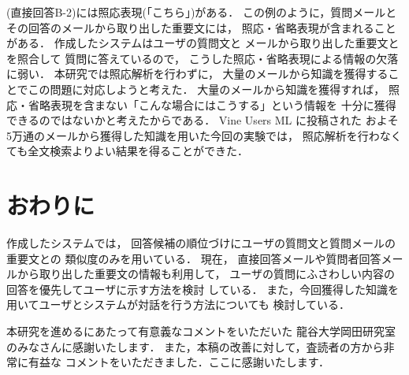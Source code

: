    (直接回答B-2)には照応表現(「こちら」)がある．
   この例のように，質問メールとその回答のメールから取り出した重要文には，
   照応・省略表現が含まれることがある．
   作成したシステムはユーザの質問文と
   メールから取り出した重要文とを照合して
   質問に答えているので，
   こうした照応・省略表現による情報の欠落に弱い．
   本研究では照応解析を行わずに，
   大量のメールから知識を獲得することでこの問題に対応しようと考えた．
   大量のメールから知識を獲得すれば，
   照応・省略表現を含まない「こんな場合にはこうする」という情報を
   十分に獲得できるのではないかと考えたからである．
   Vine Users ML に投稿された
   およそ5万通のメールから獲得した知識を用いた今回の実験では，
   照応解析を行わなくても全文検索よりよい結果を得ることができた．



 \section{おわりに}
 
作成したシステムでは，
回答候補の順位づけにユーザの質問文と質問メールの重要文との
類似度のみを用いている．
現在，
直接回答メールや質問者回答メールから取り出した重要文の情報も利用して，
ユーザの質問にふさわしい内容の回答を優先してユーザに示す方法を検討
している．
また，今回獲得した知識を用いてユーザとシステムが対話を行う方法についても
検討している．
 



\acknowledgment

本研究を進めるにあたって有意義なコメントをいただいた
龍谷大学岡田研究室のみなさんに感謝いたします．
また，本稿の改善に対して，査読者の方から非常に有益な
コメントをいただきました．ここに感謝いたします．


